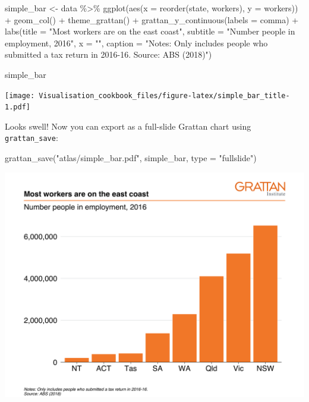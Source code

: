 \documentclass[
]{book}
\newenvironment{Shaded}{\begin{snugshade}}{\end{snugshade}}
\newcommand{\AttributeTok}[1]{\textcolor[rgb]{0.77,0.63,0.00}{#1}}
\newcommand{\FunctionTok}[1]{\textcolor[rgb]{0.00,0.00,0.00}{#1}}
\newcommand{\NormalTok}[1]{#1}
\newcommand{\OtherTok}[1]{\textcolor[rgb]{0.56,0.35,0.01}{#1}}
\newcommand{\SpecialCharTok}[1]{\textcolor[rgb]{0.00,0.00,0.00}{#1}}
\newcommand{\StringTok}[1]{\textcolor[rgb]{0.31,0.60,0.02}{#1}}
\begin{document}
\begin{Shaded}
\begin{Highlighting}[]
\NormalTok{simple\_bar }\OtherTok{\textless{}{-}}\NormalTok{ data }\SpecialCharTok{\%\textgreater{}\%} 
  \FunctionTok{ggplot}\NormalTok{(}\FunctionTok{aes}\NormalTok{(}\AttributeTok{x =} \FunctionTok{reorder}\NormalTok{(state, workers),}
             \AttributeTok{y =}\NormalTok{ workers)) }\SpecialCharTok{+} 
  \FunctionTok{geom\_col}\NormalTok{() }\SpecialCharTok{+} 
  \FunctionTok{theme\_grattan}\NormalTok{() }\SpecialCharTok{+} 
  \FunctionTok{grattan\_y\_continuous}\NormalTok{(}\AttributeTok{labels =}\NormalTok{ comma) }\SpecialCharTok{+} 
  \FunctionTok{labs}\NormalTok{(}\AttributeTok{title =} \StringTok{"Most workers are on the east coast"}\NormalTok{,}
       \AttributeTok{subtitle =} \StringTok{"Number people in employment, 2016"}\NormalTok{,}
       \AttributeTok{x =} \StringTok{""}\NormalTok{,}
       \AttributeTok{caption =} \StringTok{"Notes: Only includes people who submitted a tax return in 2016{-}16. Source: ABS (2018)"}\NormalTok{)}

\NormalTok{simple\_bar}
\end{Highlighting}
\end{Shaded}

\texttt{[image: Visualisation\_cookbook\_files/figure-latex/simple\_bar\_title-1.pdf]}

Looks swell! Now you can export as a full-slide Grattan chart using \texttt{grattan\_save}:

\begin{Shaded}
\begin{Highlighting}[]
\FunctionTok{grattan\_save}\NormalTok{(}\StringTok{"atlas/simple\_bar.pdf"}\NormalTok{, simple\_bar, }\AttributeTok{type =} \StringTok{"fullslide"}\NormalTok{)}
\end{Highlighting}
\end{Shaded}

\includegraphics{atlas/simple_bar.png}
\end{document}

